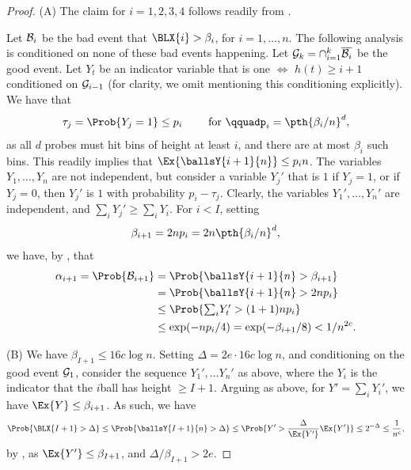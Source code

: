 \begin{proof}
    (A) The claim for $i=1,2,3,4$ follows readily from
    .

    Let $\mathcal{B}_i$ be the bad event that $\BLX{i} > \beta_i$, for
    $i=1,\ldots, n$. The following analysis is conditioned on none of
    these bad events happening. Let
    $\mathcal{G}_k = {\cap_{i=1}^k \overline{\mathcal{B}_i}}$ be the good
    event.  Let $Y_t$ be an indicator variable that is one $\iff$
    $h(t) \geq i+1$ conditioned on $\mathcal{G}_{i-1}$ (for clarity, we
    omit mentioning this conditioning explicitly). We have that
    \begin{equation*}
        \tau_j = \Prob{Y_j=1 } \leq p_i%
        \qquad\text{ for }\qquad%
        p_i=\pth{ \beta_i /n}^d,
    \end{equation*}
    as all $d$ probes must hit bins of height at least $i$, and there
    are at most $\beta_i$ such bins. This readily implies that
    $\Ex{ \ballsY{i+1}{n} } \leq p_i n$.  The variables
    $Y_1, \ldots, Y_n$ are not independent, but consider a variable
    $Y_j'$ that is $1$ if $Y_j=1$, or if $Y_j=0$, then $Y_j'$ is $1$
    with probability $p_i-\tau_j$. Clearly, the variables
    $Y_1',\ldots, Y_n'$ are independent, and
    $\sum_i Y_j' \geq \sum_i Y_i$.  For $i < I$, setting
    \begin{equation*}
        \beta_{i+1} = 2np_i  = 2 n \pth{\beta_i/n}^d,        
    \end{equation*}
    we have, by ,
    that
    \begin{align*}
      \alpha_{i+1}%
      =%
      \Prob{\BadEvent_{i+1}}%
      &=%
        \Prob{\ballsY{i+1}{n} > \beta_{i+1}}%
        \\&
        =%
        \Prob{\ballsY{i+1}{n} > 2np_i}
        \\&
        \leq 
        \Prob{ \textstyle{\sum_i} Y_t' > (1+1)n p_i}%
        \\&
      \leq%
      \exp( -n p_i/4 )
      =
      \exp(-\beta_{i+1}/8) < 1/n^{2c}.
    \end{align*}

    (B) We have $\beta_{I+1} \leq 16 c \log n$.  Setting
    $\Delta = 2e \cdot 16 c \log n$, and conditioning on the good
    event $\mathcal{G}_{1}$, consider the sequence $Y_1', \ldots Y_n'$
    as above, where the $Y_i$ is the indicator that the $i$\th ball
    has height $\geq I+1$. Arguing as above, for $Y' = \sum_i Y_i'$,
    we have $\Ex{Y} \leq \beta_{i+1}$. As such, we have
    \begin{equation*}
        \Prob{\BLX{I+1} > \Delta}
        \leq%
        \Prob{\ballsY{I+1}{n} > \Delta}%
        \leq%
        \Prob{Y' > \frac{\Delta}{\Ex{Y'}} \Ex{Y'} }           
        \leq%
        2^{ - \Delta}
        \leq%
        \frac{1}{n^c},        
    \end{equation*}
    by , as $\Ex{ Y' } \leq \beta_{I+1}$,
    and $\Delta/\beta_{I+1} > 2e$.
    

\end{proof}
